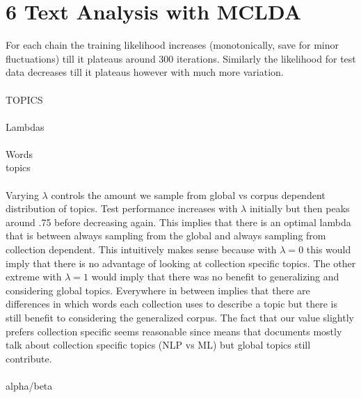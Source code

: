 \documentclass[12pt]{article}
\begin{document}
\section*{6 Text Analysis with MCLDA}
 For each chain the training likelihood increases (monotonically, save for minor fluctuations)  till it plateaus around 300 iterations. Similarly the likelihood for test data decreases till it plateaus however with much more variation. \\
\\
 TOPICS \\
\\
 Lambdas\\
\\
 Words \\
 topics \\
\\
 Varying $\lambda$ controls the amount we sample from global vs corpus dependent distribution of topics. Test performance increases with $\lambda$ initially but then peaks around .75 before decreasing again. This implies that there is an optimal lambda that is between always sampling from the global and always sampling from collection dependent. This intuitively makes sense because with $\lambda = 0$ this would imply that there is no advantage of looking at collection specific topics. The other extreme with $\lambda=1$ would imply that there was no benefit to generalizing and considering global topics. Everywhere in between implies that there are differences in which words each collection uses to describe a topic but there is still benefit to considering the generalized corpus. The fact that our value slightly prefers collection specific seems reasonable since means that documents mostly talk about collection specific topics (NLP vs ML) but global topics still contribute. 
 \\
\\
 alpha/beta \\
\\
\end{document}
